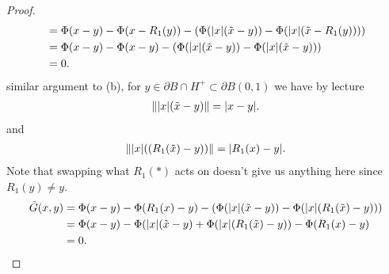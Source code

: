 \begin{proof}
\begin{align*}
                &=\Phi(x-y) - \Phi(x-R_1(y))  - (\Phi(\lvert x\rvert(\tilde{x} - y )) - \Phi(\lvert x\rvert(\tilde{x}-R_1(y))))\\
                &=\Phi(x-y) - \Phi(x-y)  - (\Phi(\lvert x\rvert(\tilde{x} - y )) - \Phi(\lvert x\rvert(\tilde{x}-y)))\\
                &= 0
.\end{align*}
similar argument to (b), for $y \in \partial B \cap H^{+} \subset  \partial B(0,1)$  we have by lecture 
\begin{align*}
  \|\lvert x\rvert(\tilde{x}-y )\| = \lvert x-y\rvert
.\end{align*}
and 
\begin{align*}
  \|\lvert x\rvert((R_1(\tilde{x}) -y ))\| = \lvert R_1(x)-y\rvert
.\end{align*}
Note that swapping  what $R_{1}(*)$ acts on doesn't give us anything here since $R_1(y) \neq y$.\\[1ex]
\begin{align*} 
 \tilde{G}(x,y) &=   \Phi(x-y) - \Phi(R_{1}(x)-y)  - (\Phi(\lvert x\rvert(\tilde{x} - y )) - \Phi(\lvert x\rvert(R_{1}(\tilde{x})-y)))\\
                &= \Phi(x-y) -  \Phi(\lvert x\rvert(\tilde{x} - y ) +   \Phi(\lvert x\rvert(R_{1}(\tilde{x})-y)) -\Phi(R_{1}(x)-y)\\
                &= 0
.\end{align*}
\end{proof}
